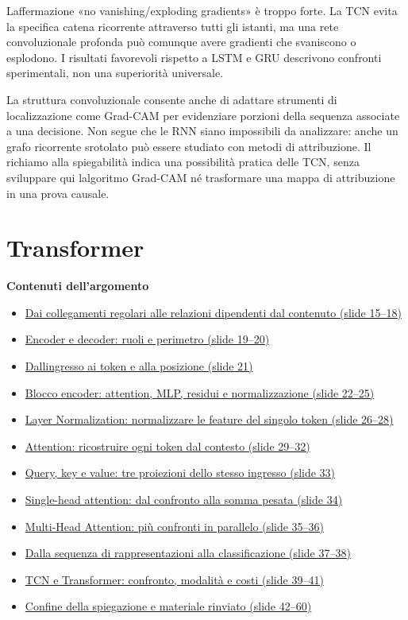 \documentclass[11pt,a4paper,oneside,openany]{book}
\renewenvironment{quote}{\list{}{\leftmargin=1em\rightmargin=0pt}\item\relax}{\endlist}
\newenvironment{indiceargomento}{\begingroup\small\sffamily\color{grigio}\textbf{Contenuti dell'argomento}\par\begin{itemize}\setlength{\itemsep}{0pt}\setlength{\parskip}{0pt}}{\end{itemize}\endgroup\medskip}
\begin{document}
\begin{quote}
L\textquotesingle affermazione «no vanishing/exploding gradients» è troppo forte. La TCN evita la specifica catena ricorrente attraverso tutti gli istanti, ma una rete convoluzionale profonda può comunque avere gradienti che svaniscono o esplodono. I risultati favorevoli rispetto a LSTM e GRU descrivono confronti sperimentali, non una superiorità universale.
\end{quote}

La struttura convoluzionale consente anche di adattare strumenti di localizzazione come Grad-CAM per evidenziare porzioni della sequenza associate a una decisione. Non segue che le RNN siano impossibili da analizzare: anche un grafo ricorrente srotolato può essere studiato con metodi di attribuzione. Il richiamo alla spiegabilità indica una possibilità pratica delle TCN, senza sviluppare qui l\textquotesingle algoritmo Grad-CAM né trasformare una mappa di attribuzione in una prova causale.

\chapter{Transformer}\label{fonte04}

\begin{indiceargomento}
\item \hyperref[f04-r266]{Dai collegamenti regolari alle relazioni dipendenti dal contenuto (slide 15--18)}
\item \hyperref[f04-r276]{Encoder e decoder: ruoli e perimetro (slide 19--20)}
\item \hyperref[f04-r296]{Dall\textquotesingle ingresso ai token e alla posizione (slide 21)}
\item \hyperref[f04-r325]{Blocco encoder: attention, MLP, residui e normalizzazione (slide 22--25)}
\item \hyperref[f04-r394]{Layer Normalization: normalizzare le feature del singolo token (slide 26--28)}
\item \hyperref[f04-r487]{Attention: ricostruire ogni token dal contesto (slide 29--32)}
\item \hyperref[f04-r540]{Query, key e value: tre proiezioni dello stesso ingresso (slide 33)}
\item \hyperref[f04-r596]{Single-head attention: dal confronto alla somma pesata (slide 34)}
\item \hyperref[f04-r716]{Multi-Head Attention: più confronti in parallelo (slide 35--36)}
\item \hyperref[f04-r766]{Dalla sequenza di rappresentazioni alla classificazione (slide 37--38)}
\item \hyperref[f04-r821]{TCN e Transformer: confronto, modalità e costi (slide 39--41)}
\item \hyperref[f04-r898]{Confine della spiegazione e materiale rinviato (slide 42--60)}
\end{indiceargomento}
\end{document}
